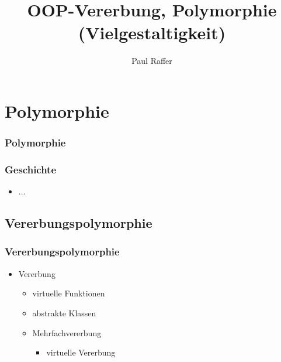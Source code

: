 \documentclass{beamer}
\title{OOP-Vererbung, Polymorphie (Vielgestaltigkeit)}
\author{Paul Raffer}
\date{}
\begin{document}
	\maketitle
	
	\section{Polymorphie}
	\begin{frame}
		\frametitle{Polymorphie}
		
	\end{frame}
	
	
	\begin{frame}
		\frametitle{Geschichte}
		\begin{itemize}
			 \item ...
		\end{itemize}
	\end{frame}
	
	
	\subsection{Vererbungspolymorphie}
	\begin{frame}
		\frametitle{Vererbungspolymorphie}
		\begin{itemize}
			\item Vererbung
			\begin{itemize}
				\item virtuelle Funktionen
				\item abstrakte Klassen
				\item Mehrfachvererbung
				\begin{itemize}
					\item virtuelle Vererbung
				\end{itemize}
			\end{itemize}
		\end{itemize}
	\end{frame}
	
\end{document}
